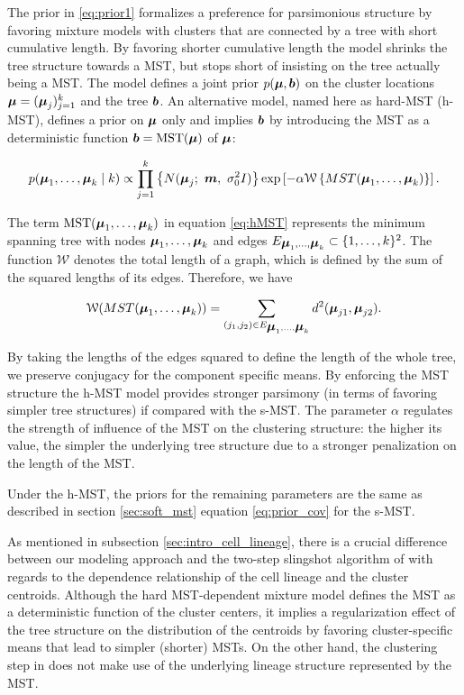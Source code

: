 The prior in \eqref{eq:prior1} formalizes a preference for parsimonious structure by favoring mixture models with clusters that are connected by a tree with short cumulative length. 
By favoring shorter cumulative length the model shrinks the tree structure towards a MST, but stops short of insisting on the tree actually being a MST. 
The model defines a joint prior $p(\mbox{\boldmath $\mu$},\mbox{\boldmath $b$})$ on the cluster locations $\mbox{\boldmath $\mu$}=(\mbox{\boldmath $\mu$}_j)^k_{j=1}$ and the tree $\mbox{\boldmath $b$}$.
An alternative model, named here as hard-MST (h-MST), defines a prior on $\mbox{\boldmath $\mu$}$ only and implies $\mbox{\boldmath $b$}$ by introducing the MST as a deterministic function $\mbox{\boldmath $b$} = \mbox{MST}(\mbox{\boldmath $\mu$})$ of $\mbox{\boldmath $\mu$}$: 

\begin{equation}
  p(\mbox{\boldmath $\mu$}_1, \ldots, \mbox{\boldmath $\mu$}_k \mid k) \propto \prod_{j=1}^k
  \left\{ N(\mbox{\boldmath $\mu$}_j; \ \mbox{\boldmath $m$}, \ \sigma^2_0I) \right\} \exp\left[ -\alpha
    \mathcal{W}\left\{ MST(\mbox{\boldmath $\mu$}_1, \ldots, \mbox{\boldmath $\mu$}_k) \right\} \right].
\label{eq:hMST}
\end{equation}

The term $\mbox{MST}(\mbox{\boldmath $\mu$}_1, \ldots, \mbox{\boldmath $\mu$}_k)$ in equation \eqref{eq:hMST} represents the minimum spanning tree with nodes $\mbox{\boldmath $\mu$}_1, \ldots, \mbox{\boldmath $\mu$}_k$ and edges $E_{\mbox{\boldmath $\mu$}_1, \ldots, \mbox{\boldmath $\mu$}_k} \subset \{1, \ldots, k\}^2$. The function $\mathcal{W}$ denotes the total length of a graph, which is defined by the sum of the squared lengths of its edges. Therefore, we have

$$\mathcal{W}(MST(\mbox{\boldmath $\mu$}_1, \ldots, \mbox{\boldmath $\mu$}_k)) = \sum_{(j_1, j_2) \in E_{\mbox{\boldmath $\mu$}_1, \ldots, \mbox{\boldmath $\mu$}_k}} d^2(\mbox{\boldmath $\mu$}_{j1}, \mbox{\boldmath $\mu$}_{j2}).$$

By taking the lengths of the edges squared to define the length of the whole tree, we preserve conjugacy for the component specific means. By enforcing the MST structure the h-MST model provides stronger parsimony (in terms of favoring simpler tree structures) if compared with the s-MST. The parameter $\alpha$ regulates the strength of influence of the MST on the clustering structure: the higher its value, the simpler the underlying tree structure due to a stronger penalization on the length of the MST.

Under the h-MST, the priors for the remaining parameters are the same as described in section \ref{sec:soft_mst} equation \eqref{eq:prior_cov} for the s-MST. 

As mentioned in subsection \ref{sec:intro_cell_lineage}, there is a crucial difference between our modeling approach and the two-step slingshot algorithm of \cite{street2018} with regards to the dependence relationship of the cell lineage and the cluster centroids. Although the hard MST-dependent mixture model defines the MST as a deterministic function of the cluster centers, it implies a regularization effect of the tree structure on the distribution of the centroids by favoring cluster-specific means that lead to simpler (shorter) MSTs. On the other hand, the clustering step in \cite{street2018} does not make use of the underlying lineage structure represented by the MST.

